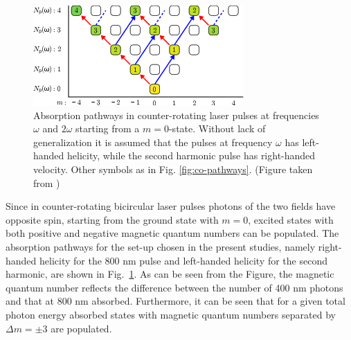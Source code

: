 \begin{figure}[!ht]
 \centering
  \includegraphics[width=0.75\columnwidth]{figs/Rydberg/counter_rotating_absorbtion.png}
 \caption{\label{fig:counter-pathways}
Absorption pathways in counter-rotating laser pulses at frequencies $\omega$ and $2 \omega$ starting from a $m=0$-state. Without lack of generalization it is assumed that the pulses at frequency $\omega$ has left-handed helicity, while the second harmonic pulse has right-handed velocity. Other symbols as in Fig. \ref{fig:co-pathways}. (Figure taken from \cite{venzke2020_ryd})
 }
 \end{figure}

Since in counter-rotating bicircular laser pulses photons of the two fields have opposite spin, starting from the ground state with $m=0$, excited states with both positive and negative magnetic quantum numbers can be populated. The absorption pathways for the set-up chosen in the present studies, namely right-handed helicity for the 800 nm pulse and left-handed helicity for the second harmonic, are shown in Fig.\ \ref{fig:counter-pathways}. As can be seen from the Figure, the magnetic quantum number reflects the difference between the number of 400 nm photons and that at 800 nm absorbed. Furthermore, it can be seen that for a given total photon energy absorbed states with magnetic quantum numbers separated by $\Delta m = \pm 3$ are populated. 

